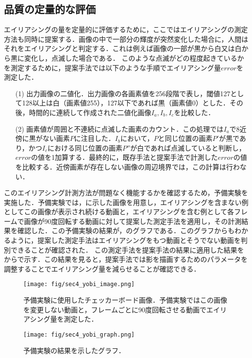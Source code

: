 \subsection{品質の定量的な評価}
エイリアシングの量を定量的に評価するために，ここではエイリアシングの測定方法も同時に提案する．画像の中で一部分の輝度が突然変化した場合に，人間はそれをエイリアシングと判定する．これは例えば画像の一部が黒から白又は白から黒に変化し，点滅した場合である．
このような点滅がどの程度起きているかを測定するために，提案手法では以下のような手順でエイリアシング量$error$を測定した．\par
\begin{itemize}
\item[(1)] 出力画像の二値化．出力画像の各画素値を256段階で表し，閾値127として128以上は白（画素値255），127以下であれば黒（画素値0）とした．その後，時間的に連続して作成された二値化画像$I_a, I_b, I_c$を比較した．
%
\item[(2)] 画素値が周囲と不連続に点滅した画素のカウント．この処理では$I_a$で8近傍に黒がない画素$P$に注目した．$I_b$において，$P$と同じ位置の画素$P'$が黒であり，かつ$I_c$における同じ位置の画素$P''$が白であれば点滅していると判断し，$error$の値を1加算する．最終的に，既存手法と提案手法で計測した$error$の値を比較する．近傍画素が存在しない画像の周辺境界では，この計算は行わない．
\end{itemize}
%
%
このエイリアシング計測方法が問題なく機能するかを確認するため，予備実験を実施した．予備実験では，に示した画像を用意し，エイリアシングを含まない例としてこの画像が表示され続ける動画と，エイリアシングを含む例として各フレームで画像が90度回転する動画に対して提案した測定手法を適用し，その計測結果を確認した．この予備実験の結果が，のグラフである．このグラフからもわかるように，提案した測定手法はエイリアシングをもつ動画とそうでない動画を判別できることが確認された．
%
この測定手法を提案手法の結果に適用した結果をからで示す．この結果を見ると，提案手法では影を描画するためのパラメータを調整することでエイリアシング量を減らせることが確認できる．\\
\begin{figure}[htb]
  \centering
    \texttt{[image: fig/sec4\_yobi\_image.png]}
    \caption{予備実験に使用したチェッカーボード画像．予備実験ではこの画像を変更しない動画と，フレームごとに90度回転させる動画でエイリアシング量を測定した．}
    \label{fig:yobi-image}
\end{figure}
%
\begin{figure}[htb]
  \centering
    \texttt{[image: fig/sec4\_yobi\_graph.png]}
    \caption{予備実験の結果を示したグラフ．}
    \label{fig:yobi-result}
\end{figure}
